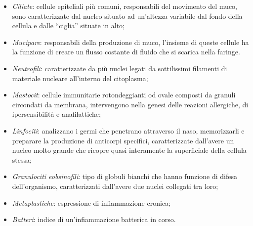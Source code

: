 \documentclass[italian,10pt,a4paper]{article}
\begin{document}
					\begin{itemize}
						\item \textit{Ciliate}: cellule epiteliali più comuni, responsabili del movimento del muco, sono caratterizzate dal nucleo situato ad un’altezza variabile dal fondo della cellula e dalle “ciglia” situate in alto;
						
						\item \textit{Mucipare}: responsabili della produzione di muco, l’insieme di queste cellule ha la funzione di creare un flusso costante di fluido che si scarica nella faringe.
						
						\item \textit{Neutrofili}: caratterizzate da più nuclei legati da sottilissimi filamenti di materiale nucleare all'interno del citoplasma;
						
						\item \textit{Mastocit}: cellule immunitarie rotondeggianti od ovale composti da granuli circondati da membrana, intervengono nella genesi delle reazioni allergiche, di ipersensibilità e anafilattiche;
						
						\item \textit{Linfociti}: analizzano i germi che penetrano attraverso il naso, memorizzarli e preparare la produzione di anticorpi specifici, caratterizzate dall’avere un nucleo molto grande che ricopre quasi interamente la superficiale della cellula stessa;
						
						\item \textit{Granulociti eobsinofili}: tipo di globuli bianchi che hanno funzione di difesa dell'organismo, caratterizzati dall’avere due nuclei collegati tra loro;
						
						\item \textit{Metaplastiche}: espressione di infiammazione cronica;
		
						\item \textit{Batteri}: indice di un'infiammazione batterica in corso.
						
					\end{itemize} 
			
\end{document}
